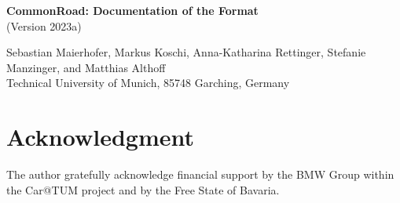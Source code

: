 \documentclass[11pt,a4paper]{article}
\begin{document}
\mbox{} \vspace{0.8cm} \mbox{}
\begin{center} {\Huge\textbf{CommonRoad: Documentation of the Format} \\[0.3cm] \huge(Version 2023a)} \end{center}
\vspace{0.2cm}
\begin{center} {\large Sebastian Maierhofer, Markus Koschi, Anna-Katharina Rettinger, Stefanie Manzinger, and Matthias Althoff} \\[0.2cm] Technical University of Munich, 85748 Garching, Germany
\end{center}
\vspace{0.2cm}

\noindent

\begin{abstract}
This document presents the \textit{CommonRoad} format for specifying road traffic scenarios.
The \textit{CommonRoad} format is composed of (1) meta information about the scenario, (2) a formal representation of the road network, (3) obstacles, and (4) planning problems for the ego vehicle(s).
So far, we have not discovered any limitations when building scenarios using the proposed format.
\end{abstract}


\setcounter{tocdepth}{3}
{\small
\tableofcontents}














\section*{Acknowledgment}

\vspace{-0.2cm}
The author gratefully acknowledge financial support by the BMW Group within the Car@TUM project and by the Free State of Bavaria.



\label{sec:bib}

%
%
%

\end{document}
